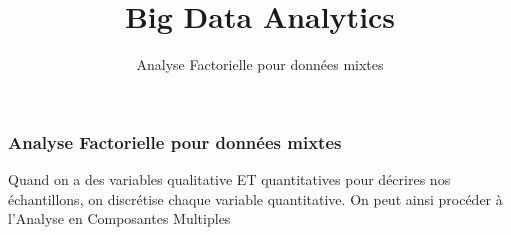 \documentclass{formation}
\title{Big Data Analytics}
\subtitle{Analyse Factorielle pour données mixtes}
\begin{document}
\maketitle

\begin{frame}
  \frametitle{Analyse Factorielle pour données mixtes}
  Quand on a des variables qualitative ET quantitatives pour décrires nos échantillons, on discrétise chaque variable quantitative. On peut ainsi procéder à l'Analyse en Composantes Multiples
\end{frame}
\end{document}
